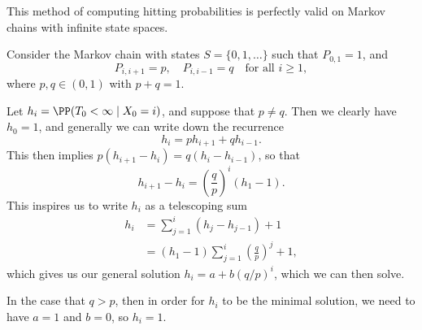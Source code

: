 \documentclass[a4paper]{scrartcl}
\begin{document}
This method of computing hitting probabilities is perfectly valid on Markov chains with infinite state spaces.

\begin{example}
	Consider the Markov chain with states $S = \{0, 1, \dots\}$ such that $P_{0, 1} = 1$, and
	$$
	P_{i, i+1} = p, \quad P_{i, i - 1} = q \quad \text{for all } i \geq 1,
	$$ 
	where $p, q \in (0, 1)$ with $p + q = 1$.

	\begin{center}
		\end{center}

	Let $h_i = \PP(T_0 < \infty \mid X_0 = i)$, and suppose that $p \neq q$. Then we clearly have $h_0 = 1$, and generally we can write down the recurrence 
	$$
		h_i = p h_{i + 1} + qh_{i - 1}.
	$$
	This then implies $p(h_{i + 1} - h_i) = q(h_{i} - h_{i - 1})$, so that
	$$
		h_{i+1} - h_{i}  = \left(\frac{q}{p}\right)^i (h_1 - 1).
	$$
	This inspires us to write $h_i$ as a telescoping sum
	\begin{align*}
		h_i &= \sum_{j = 1}^i (h_j - h_{j - 1}) + 1  \\
			&= (h_1 - 1) \sum_{j = 1}^i \left(\frac{q}{p}\right)^j + 1,
	\end{align*}
	which gives us our general solution $h_i = a + b(q/p)^i$, which we can then solve.

	In the case that $q > p$, then in order for $h_i$ to be the minimal solution, we need to have $a = 1$ and $b = 0$, so $h_i = 1$.
\end{example}

\end{document}
